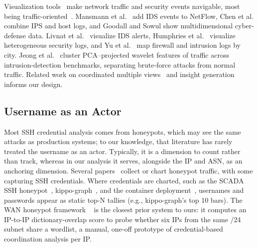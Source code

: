 \documentclass[conference]{IEEEtran}
\begin{document}
Visualization tools~\cite{mansmann2006interactive, oberheide2006flamingo,
mansmann2009visual, taylor2009flovis, chen2014oceans, tremel2022vitalflow,
xiao2006enhancing, goodall2009viassist, jeong2022interactive, choi2009fast}
make network traffic and security events navigable, most being
traffic-oriented~\cite{mansmann2006interactive, oberheide2006flamingo,
taylor2009flovis, tremel2022vitalflow, xiao2006enhancing,
jeong2022interactive, choi2009fast}. Mansmann et al.~\cite{mansmann2009visual} add IDS
events to NetFlow, Chen et al.\cite{chen2014oceans} combine IPS and host logs, and
Goodall and Sowul\cite{goodall2009viassist} show multidimensional cyber-defense data.
Livnat et al.~\cite{livnat2005visual} visualize
IDS alerts, Humphries et al.~\cite{humphries2013elvis} visualize heterogeneous security logs,
and Yu et al.~\cite{yu2010ember} map firewall and
intrusion logs by city. Jeong et al.~\cite{jeong2023multi} cluster PCA--projected wavelet 
features of traffic across intrusion-detection benchmarks, separating brute-force attacks from normal traffic.
Related work on coordinated
multiple views~\cite{king2014coordinated, ceneda2016routingwatch, roberts2007state}
and insight generation~\cite{yi2008understanding} informs our design.

\subsection{Username as an Actor}

Most SSH credential analysis comes from honeypots, which may see the same attacks as production systems; 
to our knowledge, that literature has rarely treated the username as an actor.
Typically, it is a dimension to count rather than track, whereas in our analysis
it serves, alongside the IP and ASN, as an anchoring dimension. Several papers~\cite{djap2021xb, visoottiviseth2011distributed, 
baykara2018novel, belqruch2019scada,
koniaris2013analysis, kyriakou2018container, koniaris2014honeypots} collect or chart honeypot traffic, with some
capturing SSH credentials. Where credentials are charted, such as the SCADA SSH honeypot~\cite{belqruch2019scada}, 
kippo-graph~\cite{koniaris2013analysis},
and the container deployment~\cite{kyriakou2018container}, usernames and passwords appear as static top-N tallies (e.g., kippo-graph's 
top 10 bars). The WAN honeypot framework ~\cite{fraunholz2017distributed} is the closest 
prior system to ours: it computes an IP-to-IP dictionary-overlap
score to probe whether six IPs from the same /24 subnet share a wordlist, a manual, one-off prototype of credential-based 
coordination analysis per IP.
\end{document}
